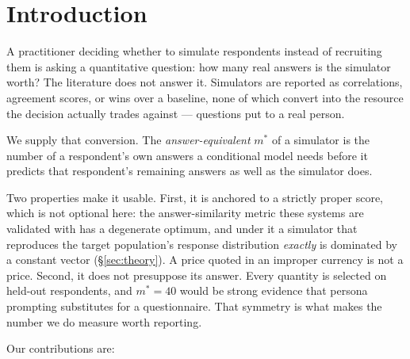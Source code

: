 \documentclass[11pt]{article}
\begin{document}
\section{Introduction}
\label{sec:intro}

A practitioner deciding whether to simulate respondents instead of recruiting
them is asking a quantitative question: how many real answers is the simulator
worth? The literature does not answer it. Simulators are reported as
correlations, agreement scores, or wins over a baseline, none of which convert
into the resource the decision actually trades against --- questions put to a
real person.

We supply that conversion. The \emph{answer-equivalent} $m^{*}$ of a simulator is
the number of a respondent's own answers a conditional model needs before it
predicts that respondent's remaining answers as well as the simulator does.

Two properties make it usable. First, it is anchored to a strictly proper score,
which is not optional here: the answer-similarity metric these systems are
validated with has a degenerate optimum, and under it a simulator that reproduces
the target population's response distribution \emph{exactly} is dominated by a
constant vector (\S\ref{sec:theory}). A price quoted in an improper currency is
not a price. Second, it does not presuppose its answer. Every quantity is
selected on held-out respondents, and $m^{*}{=}40$ would be strong evidence that
persona prompting substitutes for a questionnaire. That symmetry is what makes
the number we do measure worth reporting.

Our contributions are:
\end{document}
